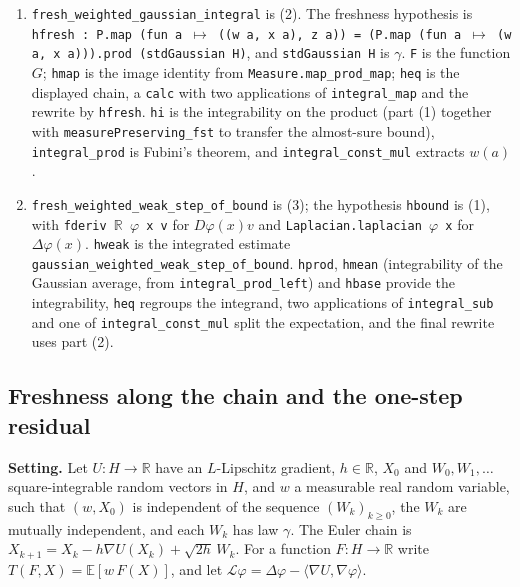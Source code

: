 \documentclass[11pt,a4paper]{report}
\begin{document}
\begin{leanbox}
\begin{enumerate}
\item \texttt{fresh\_\allowbreak{}weighted\_\allowbreak{}gaussian\_\allowbreak{}integral} is (2). The freshness hypothesis is \texttt{hfresh : P.\allowbreak{}map (fun a \ensuremath{\mapsto} ((w a, x a), z a)) = (P.\allowbreak{}map (fun a \ensuremath{\mapsto} (w a, x a))).\allowbreak{}prod (std\allowbreak{}Gaussian H)}, and \texttt{std\allowbreak{}Gaussian H} is \(\gamma\). \texttt{F} is the function \(G\); \texttt{hmap} is the image identity from \texttt{Measure.\allowbreak{}map\_\allowbreak{}prod\_\allowbreak{}map}; \texttt{heq} is the displayed chain, a \texttt{calc} with two applications of \texttt{integral\_\allowbreak{}map} and the rewrite by \texttt{hfresh}. \texttt{hi} is the integrability on the product (part (1) together with \texttt{measure\allowbreak{}Preserving\_\allowbreak{}fst} to transfer the almost-sure bound), \texttt{integral\_\allowbreak{}prod} is Fubini's theorem, and \texttt{integral\_\allowbreak{}const\_\allowbreak{}mul} extracts \(w(a)\).

\item \texttt{fresh\_\allowbreak{}weighted\_\allowbreak{}weak\_\allowbreak{}step\_\allowbreak{}of\_\allowbreak{}bound} is (3); the hypothesis \texttt{hbound} is (1), with \texttt{fderiv \ensuremath{\mathbb R} \ensuremath{\varphi} x v} for \(D\varphi(x)v\) and \texttt{Laplacian.\allowbreak{}laplacian \ensuremath{\varphi} x} for \(\Delta\varphi(x)\). \texttt{hweak} is the integrated estimate \texttt{gaussian\_\allowbreak{}weighted\_\allowbreak{}weak\_\allowbreak{}step\_\allowbreak{}of\_\allowbreak{}bound}. \texttt{hprod}, \texttt{hmean} (integrability of the Gaussian average, from \texttt{integral\_\allowbreak{}prod\_\allowbreak{}left}) and \texttt{hbase} provide the integrability, \texttt{heq} regroups the integrand, two applications of \texttt{integral\_\allowbreak{}sub} and one of \texttt{integral\_\allowbreak{}const\_\allowbreak{}mul} split the expectation, and the final rewrite uses part (2).

\end{enumerate}
\end{leanbox}
\subsection{\texorpdfstring{Freshness along the chain and the one-step residual}{Freshness along the chain and the one-step residual}}
\label{report-step-AverageLMC-LaplacianWeakChain-lean-2}


\textbf{Setting.} Let \(U:H\to\mathbb R\) have an \(L\)-Lipschitz gradient, \(h\in\mathbb R\), \(X_0\) and \(W_0,W_1,\dots\) square-integrable random vectors in \(H\), and \(w\) a measurable real random variable, such that \((w,X_0)\) is independent of the sequence \((W_k)_{k\ge0}\), the \(W_k\) are mutually independent, and each \(W_k\) has law \(\gamma\). The Euler chain is \(X_{k+1}=X_k-h\nabla U(X_k)+\sqrt{2h}\,W_k\). For a function \(F:H\to\mathbb R\) write \(T(F,X)=\mathbb E[w\,F(X)]\), and let \(\mathcal L\varphi=\Delta\varphi-\langle\nabla U,\nabla\varphi\rangle\).
\end{document}
